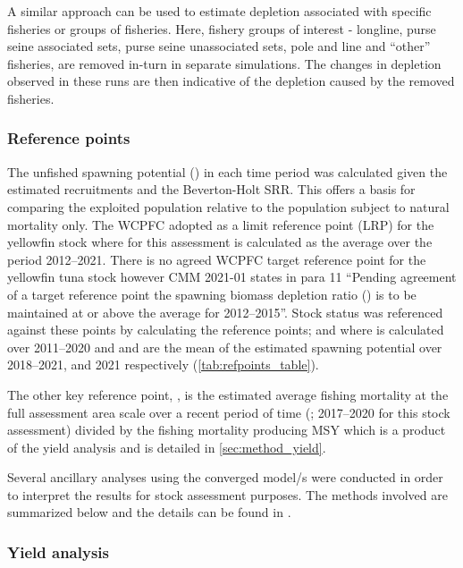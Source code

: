 A similar approach can be used to estimate depletion associated with specific fisheries or groups of fisheries. Here, fishery groups of interest - longline, purse seine associated sets, purse seine unassociated sets, pole and line and \enquote{other} fisheries, are removed in-turn in separate simulations. The changes in depletion observed in these runs are then indicative of the depletion caused by the removed fisheries.

\subsubsection{Reference points}
\label{sec:methods_reference_points}

The unfished spawning potential (\sbfo) in each time period was calculated given the estimated recruitments and the Beverton-Holt SRR. This offers a basis for comparing the exploited population relative to the population subject to natural mortality only. The WCPFC adopted \lrp as a limit reference point (LRP) for the yellowfin stock where \sbfo for this assessment is calculated as the average over the period 2012--2021. There is no agreed WCPFC target reference point for the yellowfin tuna stock however CMM 2021-01 states in para 11 ``Pending agreement of a target reference point the spawning biomass depletion ratio (\sbfo) is to be maintained at or above the average \sbfo for 2012--2015''.  Stock status was referenced against these points by calculating the reference points; \sbrsbfo and \sblsbfo where \sbfo is calculated over 2011--2020 and \sbrecent and \sblatest are the mean of the estimated spawning potential over 2018--2021, and 2021 respectively (\autoref{tab:refpoints_table}).

The other key reference point, \fref, is the estimated average fishing mortality at the full assessment area scale over a recent period of time (\frecent; 2017--2020 for this stock assessment) divided by the fishing mortality producing MSY which is a product of the yield analysis and is detailed in \autoref{sec:method_yield}.

Several ancillary analyses using the converged model/s were conducted in order to interpret the results for stock assessment purposes. The methods involved are summarized below and the details can be found in \citet{kleiber_multifan-cl_2019}.

\subsubsection{Yield analysis}
\label{sec:method_yield}

